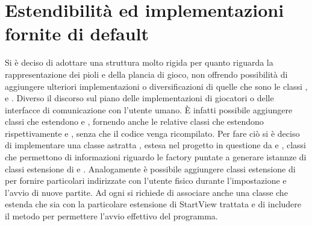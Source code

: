 \documentclass[letterpaper,10pt,italian]{sphinxmanual}
\begin{document}
\section{Estendibilità ed implementazioni fornite di default}
\label{\detokenize{introduzione:estendibilita-ed-implementazioni-fornite-di-default}}
Si è deciso di adottare una struttura molto rigida per quanto riguarda la rappresentazione dei pioli e della plancia
di gioco, non offrendo possibilità di aggiungere ulteriori implementazioni o diversificazioni di quelle che sono le classi
,  e .
Diverso il discorso sul piano delle implementazioni di giocatori o delle interfacce di comunicazione con l’utente umano.
È infatti possibile aggiungere classi che estendono  e , fornendo anche le relative classi  che estendono
rispettivamente  e , senza che il codice venga ricompilato.
Per fare ciò si è deciso di implementare una classe astratta , estesa nel progetto in questione
da  e , classi che permettono di  informazioni
riguardo le factory puntate a generare istannze di classi estensione di  e .
Analogamente è possibile aggiungere classi estensione di  per fornire particolari  indirizzate 
con l’utente fisico durante l’impostazione e l’avvio di nuove partite. Ad ogni  si richiede di associare anche una classe
che estenda  che sia  con la particolare estensione di StartView trattata e di includere il metodo  per permettere
l’avvio effettivo del programma.
\end{document}
